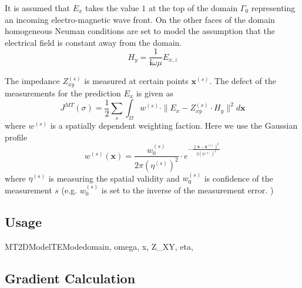 It is assumed that $E_x$ takes the value $1$ at the top of the domain $\Gamma_0$ representing an incoming 
electro-magnetic wave front. On the other faces of the domain homogeneous Neuman conditions 
are set to model the assumption that the electrical field is constant away from the domain.
\begin{equation}\label{ref:2DMTTE:EQU:4}
H_y = \frac{1}{\mathbf{i} \omega \mu} E_{x,z}
\end{equation}

The impedance $Z_{xy}^{(s)}$ is measured at certain points ${\mathbf x}^{(s)}$. The defect 
of the measurements for the prediction $E_x$ is given as 
\begin{equation}\label{ref:2DMTTE:EQU:5}
J^{MT}(\sigma) = \frac{1}{2}\sum_{s} \int_{\Omega}
w^{(s)} \cdot \| E_x - Z_{xy}^{(s)} \cdot H_y \|^2 d{\mathbf x}
\end{equation} 
where $w^{(s)}$ is a spatially dependent weighting faction. Here we use the Gaussian profile 
\begin{equation}\label{ref:2DMTTE:EQU:6}
w^{(s)}({\mathbf x}) = \frac{w^{(s)}_0}{2\pi (\eta^{(s)})^2} \cdot e^{-\frac{\|{\mathbf x} - {\mathbf x}^{(s)} \|^2}{2(\eta^{(s)})^2}}
\end{equation} 
where $\eta^{(s)}$ is measuring the spatial validity 
and $w^{(s)}_0$ is confidence of the measurement $s$ (e.g. $w^{(s)}_0$ is set to the inverse of the measurement error. )

\subsection{Usage}

\begin{classdesc}{MT2DModelTEMode}{domain, omega, x, Z_XY, eta,
}
\end{classdesc}

\subsection{Gradient Calculation}

